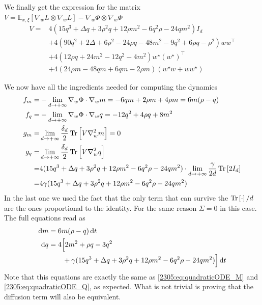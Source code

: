 We finally get the expression for  the matrix \(V=\mathbb E_{x,\xi} \left[\nabla_wL\otimes\nabla_wL\right]-\nabla_w\Phi\otimes\nabla_w\Phi\)
\begin{equation}\label{2305:eq:matrixV}\begin{split}
   V ={}& 4(15q^3+\Delta q+3\rho^2q+12\rho m^2-6q^2\rho-24qm^2)I_d \\
        &+ 4(90q^2+2\Delta+6\rho^2-24\rho q -48m^2-9q^2+6\rho q-\rho^2)ww^\top \\
        &+ 4(12\rho q + 24m^2-12q^2-4m^2)w^\star(w^\star)^\top \\
        &+ 4(24\rho m-48qm+6qm-2\rho m)(w^\star w+ ww^\star)
\end{split}\end{equation}

We now have all the ingredients needed for computing the dynamics
\[\begin{split}
    f_m =& -\lim_{d\to+\infty}\nabla_w \Phi \cdot \nabla_w m = -6qm+2\rho m +4\rho m = 6m(\rho-q) \\
    f_q =& -\lim_{d\to+\infty}\nabla_w \Phi \cdot \nabla_w q = -12q^2 + 4\rho q + 8m^2 \\
    g_m =& \lim_{d\to+\infty}\frac{\delta_d}{2}\Tr{V \nabla^2_w m}= 0\\
    g_q =& \lim_{d\to+\infty}\frac{\delta_d}{2}\Tr{V \nabla^2_w q} \\
        =& 4(15q^3+\Delta q+3\rho^2q+12\rho m^2-6q^2\rho-24qm^2)
           \cdot\lim_{d\to+\infty}\frac{\gamma}{2d}\Tr{2I_d} \\
        =& 4\gamma(15q^3+\Delta q+3\rho^2q+12\rho m^2-6q^2\rho-24qm^2)
\end{split}\]
In the last one we used the fact that the only term that can survive the \(\Tr{\cdot}/d\) are the ones proportional to the identity. For the same reason \(\Sigma = 0\) in this case. The full equations read as
\begin{equation}\label{2305:eq:phaseretrievalGBA}\begin{split}
 \dif m &= 6m(\rho-q) \dif t \\
 \dif q &= 4\Big[2m^2+\rho q-3q^2 \\
         &\qquad +\gamma(15q^3+\Delta q+3\rho^2q+12\rho m^2-6q^2\rho-24qm^2)\Big] \dif t
\end{split}\end{equation}
Note that this equations are exactly the same as \eqref{2305:eq:quadraticODE_M} and \eqref{2305:eq:quadraticODE_Q}, as expected. What is not trivial is proving that the diffusion term will also be equivalent.

